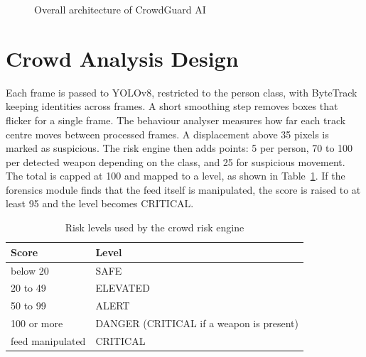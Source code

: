 \documentclass[12pt,a4paper,oneside]{report}
\begin{document}
\begin{figure}[H]
\centering
{}
\caption{Overall architecture of CrowdGuard AI}\label{fig:arch}
\end{figure}

\section{Crowd Analysis Design}
Each frame is passed to YOLOv8, restricted to the person class, with ByteTrack keeping identities across frames. A short smoothing step removes boxes that flicker for a single frame. The behaviour analyser measures how far each track centre moves between processed frames. A displacement above 35 pixels is marked as suspicious. The risk engine then adds points: 5 per person, 70 to 100 per detected weapon depending on the class, and 25 for suspicious movement. The total is capped at 100 and mapped to a level, as shown in Table~\ref{tab:risk}. If the forensics module finds that the feed itself is manipulated, the score is raised to at least 95 and the level becomes CRITICAL.

\begin{table}[H]
\centering
\caption{Risk levels used by the crowd risk engine}\label{tab:risk}
\begin{tabular}{@{}ll@{}}
\toprule
Score & Level \\
\midrule
below 20 & SAFE \\
20 to 49 & ELEVATED \\
50 to 99 & ALERT \\
100 or more & DANGER (CRITICAL if a weapon is present) \\
feed manipulated & CRITICAL \\
\bottomrule
\end{tabular}
\end{table}
\end{document}
